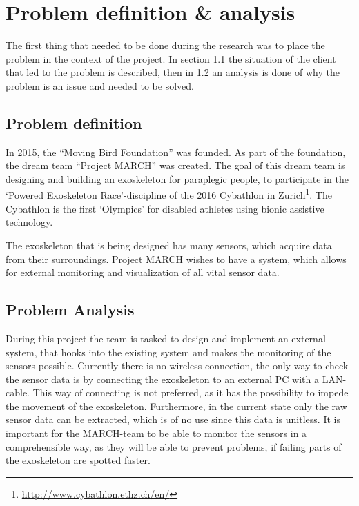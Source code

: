 \section{Problem definition \& analysis} \label{sec:probdef}
The first thing that needed to be done during the research was to place the problem in the context of the project. In section \ref{sec:prodef} the situation of the client that led to the problem is described, then in \ref{sec:proana} an analysis is done of why the problem is an issue and needed to be solved.

\subsection{Problem definition}\label{sec:prodef}
In 2015, the ``Moving Bird Foundation'' was founded. As part of the foundation, the dream team ``Project MARCH'' was created. The goal of this dream team is designing and building an exoskeleton for paraplegic people, to participate in the `Powered Exoskeleton Race'-discipline of the 2016 Cybathlon in Zurich\footnote{\url{http://www.cybathlon.ethz.ch/en/}}. The Cybathlon is the first `Olympics' for disabled athletes using bionic assistive technology.
 
The exoskeleton that is being designed has many sensors, which acquire data from their surroundings. Project MARCH wishes to have a system, which allows for external monitoring and visualization of all vital sensor data.

\subsection{Problem Analysis}\label{sec:proana}
During this project the team is tasked to design and implement an external system, that hooks into the existing system and makes the monitoring of the sensors possible. Currently there is no wireless connection, the only way to check the sensor data is by connecting the exoskeleton to an external PC with a LAN-cable. This way of connecting is not preferred, as it has the possibility to impede the movement of the exoskeleton.
Furthermore, in the current state only the raw sensor data can be extracted, which is of no use since this data is unitless. It is important for the MARCH-team to be able to monitor the sensors in a comprehensible way, as they will be able to prevent problems, if failing parts of the exoskeleton are spotted faster.